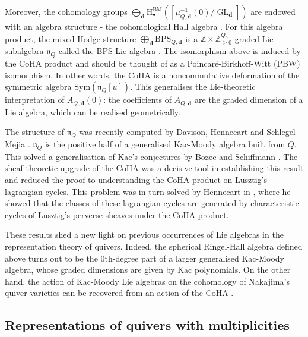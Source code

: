 \documentclass[11pt,english]{article}
\numberwithin{equation}{section}
\numberwithin{figure}{section}
\theoremstyle{definition}
\theoremstyle{plain}
\theoremstyle{remark}
\DeclareMathOperator{\GL}{GL}
\newcommand\dd{\mathbf{d}}
\newcommand\HH{\mathrm{H}}
\newcommand\ZZ{\mathbb{Z}}
\begin{document}
Moreover, the cohomology groups $\bigoplus_{\dd}\HH_{\bullet}^{\mathrm{BM}}\left(\left[\mu_{Q,\dd}^{-1}(0)/\GL_{\dd}\right]\right)$
are endowed with an algebra structure - the cohomological Hall algebra
\cite{SV13b,YZ18a}. For this algebra product, the mixed Hodge structure
$\bigoplus_{\dd}\mathrm{BPS}_{Q,\dd}$ is a $\ZZ\times\ZZ_{\geq0}^{Q_{0}}$-graded
Lie subalgebra $\mathfrak{n}_{Q}$ called the BPS Lie algebra \cite{DM20,Dav20}.
The isomorphism above is induced by the CoHA product and should be
thought of as a Poincaré-Birkhoff-Witt (PBW) isomorphism. In other
words, the CoHA is a noncommutative deformation of the symmetric algebra
$\mathrm{Sym}\left(\mathfrak{n}_{Q}[u]\right)$. This generalises
the Lie-theoretic interpretation of $A_{Q,\dd}(0)$: the coefficients
of $A_{Q,\dd}$ are the graded dimension of a Lie algebra, which can
be realised geometrically. 

The structure of $\mathfrak{n}_{Q}$ was recently computed by Davison,
Hennecart and Schlegel-Mejia \cite{DHSM22,DHSM23}. $\mathfrak{n}_{Q}$
is the positive half of a generalised Kac-Moody algebra built from
$Q$. This solved a generalisation of Kac's conjectures by Bozec and
Schiffmann \cite{BS19a}. The sheaf-theoretic upgrade of the CoHA
was a decisive tool in establishing this result and reduced the proof
to understanding the CoHA product on Lusztig's lagrangian cycles.
This problem was in turn solved by Hennecart in \cite{Hen24}, where
he showed that the classes of these lagrangian cycles are generated
by characteristic cycles of Lusztig's perverse sheaves under the CoHA
product.

These results shed a new light on previous occurrences of Lie algebras
in the representation theory of quivers. Indeed, the spherical Ringel-Hall
algebra defined above turns out to be the 0th-degree part of a larger
generalised Kac-Moody algebra, whose graded dimensions are given by
Kac polynomials. On the other hand, the action of Kac-Moody Lie algebras
on the cohomology of Nakajima's quiver varieties \cite{Nak98} can
be recovered from an action of the CoHA \cite{DHSM23}.

\subsection*{Representations of quivers with multiplicities}
\end{document}
